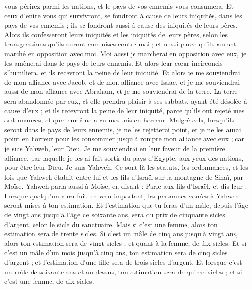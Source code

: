 \begin{multicols}{2}
vous périrez parmi les nations, et le pays de vos ennemis vous consumera.
Et ceux d'entre vous qui survivront, se fondront à cause de leurs iniquités, dans les pays de vos ennemis ; ils se fondront aussi à cause des iniquités de leurs pères.
Alors ils confesseront leurs iniquités et les iniquités de leurs pères, selon les transgressions qu'ils auront commises contre moi ; et aussi parce qu'ils auront marché en opposition avec moi.
Moi aussi je marcherai en opposition avec eux, je les amènerai dans le pays de leurs ennemis. Et alors leur cœur incirconcis s'humiliera, et ils recevront la peine de leur iniquité.
Et alors je me souviendrai de mon alliance avec Jacob, et de mon alliance avec Isaac, et je me souviendrai aussi de mon alliance avec Abraham, et je me souviendrai de la terre.
La terre sera abandonnée par eux, et elle prendra plaisir à ses sabbats, ayant été désolée à cause d'eux ; et ils recevront la peine de leur iniquité, parce qu'ils ont rejeté mes ordonnances, et que leur âme a eu mes lois en horreur.
Malgré cela, lorsqu'ils seront dans le pays de leurs ennemis, je ne les rejetterai point, et je ne les aurai point en horreur pour les consommer jusqu'à rompre mon alliance avec eux ; car je suis Yahweh, leur Dieu.
Je me souviendrai en leur faveur de la première alliance, par laquelle je les ai fait sortir du pays d'Egypte, aux yeux des nations, pour être leur Dieu. Je suis Yahweh.
Ce sont là les statuts, les ordonnances, et les lois que Yahweh établit entre lui et les fils d'Israël sur la montagne de Sinaï, par Moïse.
\VerseOne{}Yahweh parla aussi à Moïse, en disant :
Parle aux fils d'Israël, et dis-leur : Lorsque quelqu'un aura fait un vœu important, les personnes vouées à Yahweh seront mises à ton estimation.
Et l'estimation que tu feras d'un mâle, depuis l'âge de vingt ans jusqu'à l'âge de soixante ans, sera du prix de cinquante sicles d'argent, selon le sicle du sanctuaire.
Mais si c'est une femme, alors ton estimation sera de trente sicles.
Si c'est un mâle de cinq ans jusqu'à vingt ans, alors ton estimation sera de vingt sicles ; et quant à la femme, de dix sicles.
Et si c'est un mâle d'un mois jusqu'à cinq ans, ton estimation sera de cinq sicles d'argent ; et l'estimation d'une fille sera de trois sicles d'argent.
Et lorsque c'est un mâle de soixante ans et au-dessus, ton estimation sera de quinze sicles ; et si c'est une femme, de dix sicles.

\end{multicols}
